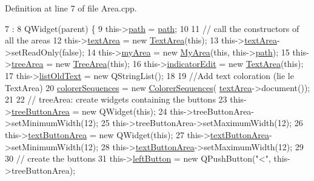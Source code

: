 Definition at line 7 of file Area.\+cpp.


\begin{DoxyCode}
7                                         :
8     QWidget(parent) \{
9     this->\hyperlink{classArea_a34549bb32869fc241c911f2c8f6e6344}{path} = \hyperlink{classArea_a34549bb32869fc241c911f2c8f6e6344}{path};
10 
11     \textcolor{comment}{// call the constructors of all the areas}
12     this->\hyperlink{classArea_a001e5b841c3e4126a128de13171f05d3}{textArea} = \textcolor{keyword}{new} \hyperlink{classTextArea}{TextArea}(\textcolor{keyword}{this});
13     this->\hyperlink{classArea_a001e5b841c3e4126a128de13171f05d3}{textArea}->setReadOnly(\textcolor{keyword}{false});
14     this->\hyperlink{classArea_a3c00ea9bb14425efbee3fcf80410c4cf}{myArea} = \textcolor{keyword}{new} \hyperlink{classMyArea}{MyArea}(\textcolor{keyword}{this}, this->\hyperlink{classArea_a34549bb32869fc241c911f2c8f6e6344}{path});
15     this->\hyperlink{classArea_a950b6ed9a4e754ef1a7879b727ea8749}{treeArea} = \textcolor{keyword}{new} \hyperlink{classTreeArea}{TreeArea}(\textcolor{keyword}{this});
16     this->\hyperlink{classArea_a330747ed9932e54f1fb3c5a8089149b9}{indicatorEdit} = \textcolor{keyword}{new} \hyperlink{classTextArea}{TextArea}(\textcolor{keyword}{this});
17     this->\hyperlink{classArea_a631ca23eb7e0c5d256239fae64768c1c}{listOldText} = \textcolor{keyword}{new} QStringList();
18 
19     \textcolor{comment}{//Add text coloration (lie le TextArea)}
20     \hyperlink{classArea_a5dde170cf27046b457c18a7f05b78a51}{colorerSequences} = \textcolor{keyword}{new} \hyperlink{classColorerSequences}{ColorerSequences}(
      \hyperlink{classArea_a001e5b841c3e4126a128de13171f05d3}{textArea}->document());
21 
22     \textcolor{comment}{// treeArea: create widgets containing the buttons}
23     this->\hyperlink{classArea_a48df84597b567dfc8b54305ca9faf072}{treeButtonArea} = \textcolor{keyword}{new} QWidget(\textcolor{keyword}{this});
24     this->treeButtonArea->setMinimumWidth(12);
25     this->treeButtonArea->setMaximumWidth(12);
26     this->\hyperlink{classArea_a6c88fecf579e816309421ebb2f4110e8}{textButtonArea} = \textcolor{keyword}{new} QWidget(\textcolor{keyword}{this});
27     this->\hyperlink{classArea_a6c88fecf579e816309421ebb2f4110e8}{textButtonArea}->setMinimumWidth(12);
28     this->\hyperlink{classArea_a6c88fecf579e816309421ebb2f4110e8}{textButtonArea}->setMaximumWidth(12);
29 
30     \textcolor{comment}{// create the buttons}
31     this->\hyperlink{classArea_ac3abf6be3202aedd2cc9ccf8da053989}{leftButton} = \textcolor{keyword}{new} QPushButton(\textcolor{stringliteral}{"<"}, this->treeButtonArea);

\end{DoxyCode}
